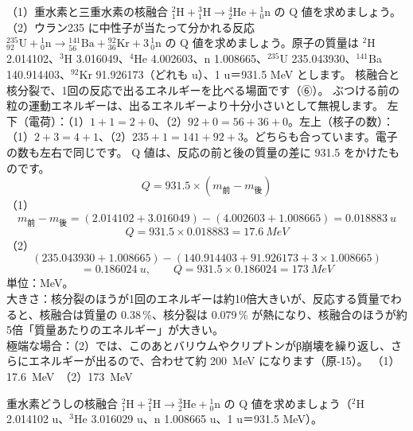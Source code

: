\label{ph:原-11:ex3}
\begin{phreidai}[核融合と核分裂の Q 値]
（1）重水素と三重水素の核融合 ${}^2_1\mathrm H+{}^3_1\mathrm H\to{}^4_2\mathrm{He}+{}^1_0\mathrm n$ の Q 値を求めましょう。（2）ウラン235 に中性子が当たって分かれる反応 ${}^{235}_{92}\mathrm U+{}^1_0\mathrm n\to{}^{141}_{56}\mathrm{Ba}+{}^{92}_{36}\mathrm{Kr}+3\,{}^1_0\mathrm n$ の Q 値を求めましょう。原子の質量は ${}^2$H 2.014102、${}^3$H 3.016049、${}^4$He 4.002603、n 1.008665、${}^{235}$U 235.043930、${}^{141}$Ba 140.914403、${}^{92}$Kr 91.926173（どれも u）、1 u＝931.5 MeV とします。
\phbamen
核融合と核分裂で、1回の反応で出るエネルギーを比べる場面です（⑥）。
\phmushi
ぶつける前の粒の運動エネルギーは、出るエネルギーより十分小さいとして無視します。
\phzu
左下（電荷）：（1）$1+1=2+0$、（2）$92+0=56+36+0$。左上（核子の数）：（1）$2+3=4+1$、（2）$235+1=141+92+3$。どちらも合っています。電子の数も左右で同じです。
\phriyu
Q 値は、反応の前と後の質量の差に 931.5 をかけたものです。
\phtateru
\[ Q=931.5\times(m_{\text{前}}-m_{\text{後}}) \]
\phtoku
（1）
\[ m_{\text{前}}-m_{\text{後}}=(2.014102+3.016049)-(4.002603+1.008665)=\qty{0.018883}{u} \]
\[ Q=931.5\times0.018883=\qty{17.6}{MeV} \]
（2）
\[ (235.043930+1.008665)-(140.914403+91.926173+3\times1.008665) \]
\[ =\qty{0.186024}{u},\qquad Q=931.5\times0.186024=\qty{173}{MeV} \]
\phtashikame
単位：MeV。\\
大きさ：核分裂のほうが1回のエネルギーは約10倍大きいが、反応する質量でわると、核融合は質量の 0.38\,\%、核分裂は 0.079\,\% が熱になり、核融合のほうが約5倍「質量あたりのエネルギー」が大きい。\\
極端な場合：（2）では、このあとバリウムやクリプトンがβ崩壊を繰り返し、さらにエネルギーが出るので、合わせて約 \qty{200}{MeV} になります（原-15）。
\kotae （1）\qty{17.6}{MeV}　（2）\qty{173}{MeV}
\end{phreidai}
\begin{jibun}
重水素どうしの核融合 ${}^2_1\mathrm H+{}^2_1\mathrm H\to{}^3_2\mathrm{He}+{}^1_0\mathrm n$ の Q 値を求めましょう（${}^2$H 2.014102 u、${}^3$He 3.016029 u、n 1.008665 u、1 u＝931.5 MeV）。
\end{jibun}

